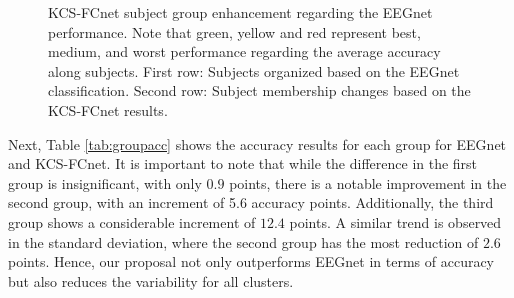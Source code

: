 \begin{figure}[h!]
    \centering
    \resizebox{\linewidth}{!}{}
    \caption{KCS-FCnet subject group enhancement regarding the EEGnet performance. Note that green, yellow and red represent best, medium, and worst performance regarding the average accuracy along subjects. First row: Subjects organized based on the EEGnet classification. Second row: Subject membership changes based on the KCS-FCnet results. }\label{fig:belongcomp}
\end{figure}


Next, Table \ref{tab:groupacc} shows the accuracy results for each group for EEGnet and KCS-FCnet. It is important to note that while the difference in the first group is insignificant, with only $0.9$ points, there is a notable improvement in the second group, with an increment of 5.6 accuracy points. Additionally, the third group shows a considerable increment of $12.4$ points. A similar trend is observed in the standard deviation, where the second group has the most reduction of $2.6$ points. Hence, our proposal not only outperforms EEGnet in terms of accuracy but also reduces the variability for all clusters.
	
	

